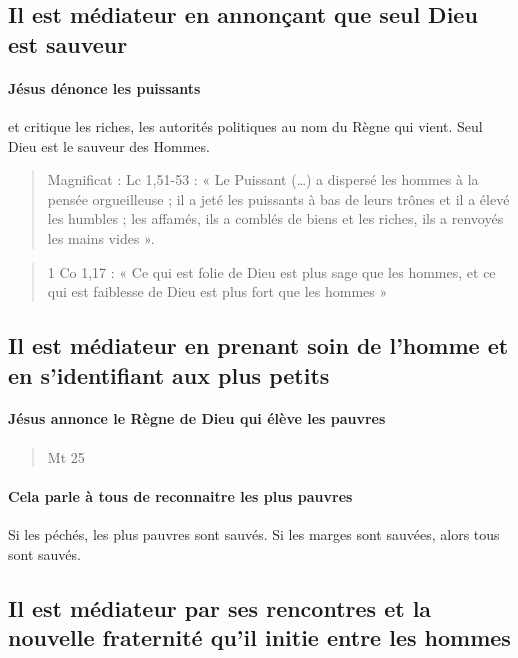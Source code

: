 \subsection{Il est médiateur en annonçant que seul Dieu est sauveur
}

\paragraph{Jésus dénonce les puissants} et critique les riches, les autorités politiques au nom du Règne qui vient. Seul Dieu est le sauveur des Hommes.
\begin{quote}
    Magnificat : Lc 1,51-53 : « Le Puissant (…) a dispersé les hommes à la pensée orgueilleuse ; il a jeté les
puissants à bas de leurs trônes et il a élevé les humbles ; les affamés, ils a comblés de biens et
les riches, ils a renvoyés les mains vides ».
\end{quote}

\begin{quote}
    1 Co 1,17 : « Ce qui est folie de Dieu est plus sage que les hommes, et ce qui est faiblesse de
Dieu est plus fort que les hommes »
  
\end{quote}
\subsection{Il est médiateur en prenant soin de l’homme et en s’identifiant aux plus petits}

\paragraph{Jésus annonce le Règne de Dieu qui élève les pauvres}

\begin{quote}
    Mt 25
\end{quote}
 
\paragraph{Cela parle à tous de reconnaitre les plus pauvres} Si les péchés, les plus pauvres sont sauvés. Si les marges sont sauvées, alors tous sont sauvés.


\subsection{Il est médiateur par ses rencontres et la nouvelle fraternité qu’il initie entre les
hommes}

